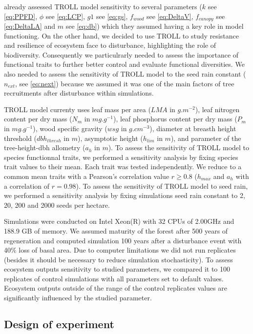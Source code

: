 \documentclass[12pt,]{article}
\theoremstyle{definition}
\theoremstyle{definition}
\theoremstyle{remark}
\begin{document}
\citet{Li} already assessed TROLL model sensitivity to several
parameters (\(k\) see \eqref{eq:PPFD}, \(\phi\) see \eqref{eq:LCP}, \(g1\)
see \eqref{eq:gs}, \(f_{wood}\) see \eqref{eq:DeltaV}, \(f_{canopy}\) see
\eqref{eq:DeltaLA} and \(m\) see \eqref{eq:db}) which they assumed having a
key role in model functioning. On the other hand, we decided to use
TROLL to study resistance and resilience of ecosystem face to
disturbance, highlighting the role of biodiversity. Consequently we
particulrarly needed to assess the importance of functional traits to
further better control and evaluate functional diversities. We also
needed to assess the sensitivity of TROLL model to the seed rain
constant (\(n_{ext}\), see \eqref{eq:next}) because we assumed it was one
of the main factors of tree recruitments after disturbance within
simulations.

TROLL model currenty uses leaf mass per area (\(LMA\) in \(g.m^{-2}\)),
leaf nitrogen content per dry mass (\(N_m\) in \(mg.g^{-1}\)), leaf
phosphorus content per dry mass (\(P_m\) in \(mg.g^{-1}\)), wood
specific gravity (\(wsg\) in \(g.cm^{-3}\)), diameter at breasth height
threshold (\(dbh_{thresh}\) in \(m\)), asymptotic height (\(h_{lim}\) in
\(m\)), and parameter of the tree-height-dbh allometry (\(a_h\) in
\(m\)). To assess the sensitivity of TROLL model to species functionnal
traits, we performed a sensitivity analysis by fixing species trait
values to their mean. Each trait was tested independently. We reduce to
a common mean traits with a Pearson's correlation value \(r \geq 0.8\)
(\(h_{max}\) and \(a_h\) with a correlation of \(r=0.98\)). To assess
the sensitivity of TROLL model to seed rain, we performed a sensitivity
analysis by fixing simulations seed rain constant to 2, 20, 200 and 2000
seeds per hectare.

Simulations were conducted on Intel Xeon(R) with 32 CPUs of 2.00GHz and
188.9 GB of memory. We assumed maturity of the forest after 500 years of
regeneration \citet{Li} and computed simulation 100 years after a
disturbance event with 40\% loss of basal area. Due to computer
limitations we did not run replicates (besides it should be necessary to
reduce simulation stochasticity). To assess ecosystem outputs
sensitivity to studied parameters, we compared it to 100 replicates of
control simulations with all parameters set to default values. Ecosystem
outputs outside of the range of the control replicates values are
significantly influenced by the studied parameter.

\subsection{Design of experiment}\label{design-of-experiment}
\end{document}
